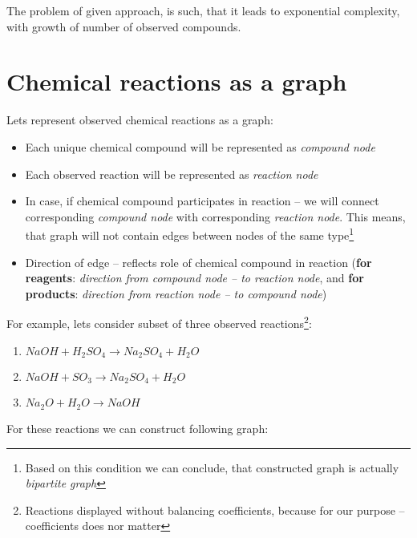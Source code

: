 \documentclass[10pt]{article}
\begin{document}
The problem of given approach, is such, that it leads to exponential complexity, with growth of number of observed compounds.

\newpage

\section{Chemical reactions as a graph}

Lets represent observed chemical reactions as a graph: 
\begin{itemize}
    \setlength \itemsep{0em}
    \item Each unique chemical compound will be represented as \emph{compound node}
    \item Each observed reaction will be represented as \emph{reaction node}
    \item In case, if chemical compound participates in reaction -- we will connect corresponding \emph{compound node} with corresponding \emph{reaction node}. This means, that graph will not contain edges between nodes of the same type\footnote{Based on this condition we can conclude, that constructed graph is actually \emph{bipartite graph}}
    \item Direction of edge -- reflects role of chemical compound in reaction (\textbf{for reagents}: \emph{direction from compound node -- to reaction node}, and \textbf{for products}: \emph{direction from reaction node -- to compound node})
\end{itemize}

\noindent For example, lets consider subset of three observed reactions\footnote{Reactions displayed without balancing coefficients, because for our purpose -- coefficients does nor matter}:

\begin{enumerate}
    \setlength \itemsep{0em}
    \item $NaOH + H_{2}SO_{4} \rightarrow Na_{2}SO_{4} + H_{2}O$
    \item $NaOH + SO_{3} \rightarrow Na_{2}SO_{4} + H_{2}O$
    \item $Na_{2}O + H_{2}O \rightarrow NaOH$
\end{enumerate}

\noindent For these reactions we can construct following graph:
\end{document}
